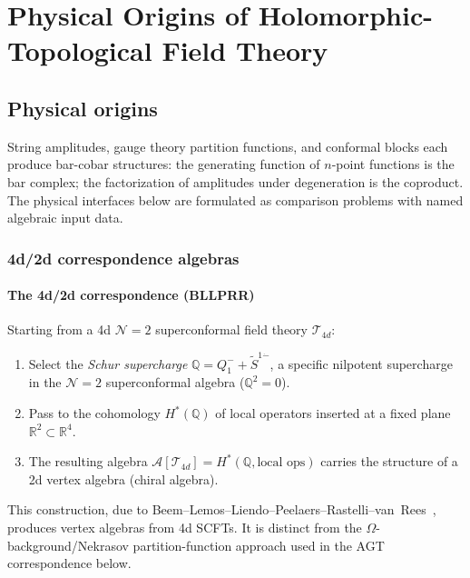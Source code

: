 \chapter{Physical Origins of Holomorphic-Topological Field Theory}
\label{chap:ht-physical-origins}


\section{Physical origins}
\label{sec:physical-origins-overview}
\label{chap:physical-origins}
\label{rem:physical-origins}

String amplitudes, gauge theory partition functions, and conformal
blocks each produce bar-cobar structures: the generating function of
$n$-point functions is the bar complex; the factorization of
amplitudes under degeneration is the coproduct. The physical interfaces
below are formulated as comparison problems with named algebraic input
data.

\subsection{4d/2d correspondence algebras}
\label{sec:4d2d}

\subsubsection{The 4d/2d correspondence (BLLPRR)}

\begin{construction}\label{constr:4d2d}
Starting from a 4d $\mathcal{N} = 2$ superconformal field theory $\mathcal{T}_{4d}$:
\begin{enumerate}[label=(\roman*)]
\item Select the \emph{Schur supercharge} $\mathbb{Q} = Q_1^- + \widetilde{S}^{1\dot{-}}$, a specific nilpotent supercharge in the $\mathcal{N}=2$ superconformal algebra ($\mathbb{Q}^2 = 0$).
\item Pass to the cohomology $H^*(\mathbb{Q})$ of local operators inserted at a fixed plane $\mathbb{R}^2 \subset \mathbb{R}^4$.
\item The resulting algebra $\mathcal{A}[\mathcal{T}_{4d}] = H^*(\mathbb{Q}, \text{local ops})$ carries the structure of a 2d vertex algebra (chiral algebra).
\end{enumerate}

This construction, due to Beem--Lemos--Liendo--Peelaers--Rastelli--van~Rees~\cite{beem-et-al}, produces vertex algebras from 4d SCFTs.
It is distinct from the $\Omega$-background/Nekrasov partition-function
approach used in the AGT correspondence below.
\end{construction}

